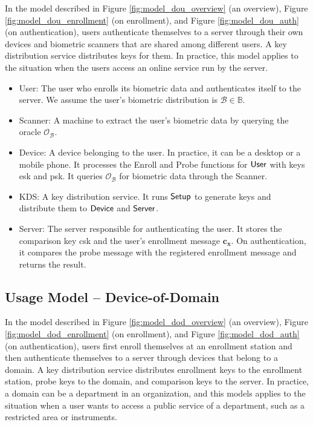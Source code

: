 In the model described in Figure \ref{fig:model_dou_overview} (an overview), Figure \ref{fig:model_dou_enrollment} (on enrollment), and Figure \ref{fig:model_dou_auth} (on authentication), users authenticate themselves to a server through their own devices and biometric scanners that are shared among different users.
A key distribution service distributes keys for them. In practice, this model applies to the situation when the users access an online service run by the server.

\begin{itemize}

	\item {\sf User}: The user who enrolls its biometric data and authenticates itself to the server. We assume the user's biometric distribution is $\mathcal{B} \in \mathbb{B}$. 

	\item {\sf Scanner}: A machine to extract the user's biometric data by querying the oracle $\mathcal{O}_{\mathcal{B}}$.
	
	\item {\sf Device}: A device belonging to the user. In practice, it can be a desktop or a mobile phone. It processes the {\sf Enroll} and {\sf Probe} functions for ${\sf User}$ with keys {\sf esk} and {\sf psk}. It queries $\mathcal{O}_{\mathcal{B}}$ for biometric data through the {\sf Scanner}.
	
	\item {\sf KDS}: A key distribution service. It runs ${\sf Setup}$ to generate keys and distribute them to ${\sf Device}$ and ${\sf Server}$.
		
	\item {\sf Server}: The server responsible for authenticating the user. It stores the comparison key {\sf csk} and the user's enrollment message $\mathbf{c_x}$. On authentication, it compares the probe message with the registered enrollment message and returns the result.  

\end{itemize}




\pagebreak

\subsection{Usage Model – Device-of-Domain}
\label{sec:dod_model}

In the model described in Figure \ref{fig:model_dod_overview} (an overview), Figure \ref{fig:model_dod_enrollment} (on enrollment), and Figure \ref{fig:model_dod_auth} (on authentication), users first enroll themselves at an enrollment station and then authenticate themselves to a server through devices that belong to a domain.
A key distribution service distributes enrollment keys to the enrollment station, probe keys to the domain, and comparison keys to the server. In practice, a domain can be a department in an organization, and this models applies to the situation when a user wants to access a public service of a department, such as a restricted area or instruments. 

